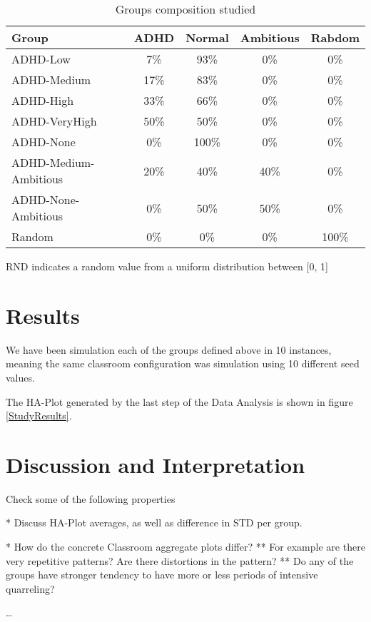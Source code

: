 \begin{table}[h!]
    \centering
    \begin{tabular}{|l|c|c|c|c|} 
        \hline
        \textbf{Group} & \textbf{ADHD} & \textbf{Normal} & \textbf{Ambitious} &  \textbf{Rabdom} \\
        \hline
        \hline
        ADHD-Low & 7\% & 93\% & 0\% & 0\% \\
        \hline
        ADHD-Medium & 17\% & 83\% & 0\% & 0\% \\
        \hline
        ADHD-High & 33\% & 66\% & 0\% & 0\% \\
        \hline
        ADHD-VeryHigh & 50\% & 50\% & 0\% & 0\% \\
        \hline
        ADHD-None & 0\% & 100\% & 0\% & 0\% \\
        \hline
        ADHD-Medium-Ambitious & 20\% & 40\% & 40\% & 0\%\\
        \hline
        ADHD-None-Ambitious & 0\% & 50\% & 50\% & 0\% \\
        \hline
        Random & 0\% & 0\% & 0\% & 100\% \\
        \hline
    \end{tabular}
    \caption{Groups composition studied}
    \small RND indicates a random value from a uniform distribution between [0, 1]
    \label{GroupTable}
\end{table}

\section{Results}
We have been simulation each of the groups defined above in 10 instances, meaning 
the same classroom configuration was simulation using 10 different seed values.

The HA-Plot generated by the last step of the Data Analysis is shown in figure \ref{StudyResults}.

\begin{figure}[]
\end{figure}

\section{Discussion and Interpretation}
Check some of the following properties

* Discuss HA-Plot averages, as well as difference in STD per group.

* How do the concrete Classroom aggregate plots differ?
    ** For example are there very repetitive patterns? Are there distortions in the pattern?
    ** Do any of the groups have stronger tendency to have more or less periods of intensive quarreling?

\dots


